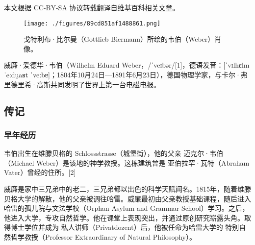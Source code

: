 
本文根据 CC-BY-SA 协议转载翻译自维基百科\href{https://en.wikipedia.org/wiki/Wilhelm_Eduard_Weber}{相关文章}。

\begin{figure}[ht]
\centering
\texttt{[image: ./figures/89cd851af1488861.png]}
\caption{戈特利布·比尔曼（Gottlieb Biermann）所绘的韦伯（Weber）肖像。} \label{fig_Eduard_1}
\end{figure}
威廉·爱德华·韦伯（Wilhelm Eduard Weber，/ˈveɪbər/[1]，德语发音：[ˈvɪlhɛlm ˈeːdu̯aʁt ˈveːbɐ]；1804年10月24日—1891年6月23日），德国物理学家，与卡尔·弗里德里希·高斯共同发明了世界上第一台电磁电报。
\subsection{传记}  
\subsubsection{早年经历 } 
韦伯出生在维滕贝格的 Schlossstrasse（城堡街），他的父亲 迈克尔·韦伯（Michael Weber）是该地的神学教授。这栋建筑曾是 亚伯拉罕·瓦特（Abraham Vater）曾经的住所。[2]  

威廉是家中三兄弟中的老二，三兄弟都以出色的科学天赋闻名。1815年，随着维滕贝格大学的解散，他的父亲被调往哈雷。威廉最初由父亲教授基础课程，随后进入哈雷的孤儿院与文法学校（Orphan Asylum and Grammar School）学习。之后，他进入大学，专攻自然哲学。他在课堂上表现突出，并通过原创研究崭露头角。取得博士学位并成为 私人讲师（Privatdozent）后，他被任命为哈雷大学的 特别自然哲学教授（Professor Extraordinary of Natural Philosophy）。
